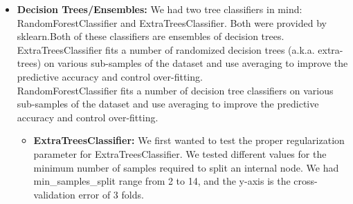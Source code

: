 \begin{itemize}
\begin{itemize}
    \pagebreak

    \item \textbf{Decision Trees/Ensembles:}
        We had two tree classifiers in mind: RandomForestClassifier and
        ExtraTreesClassifier. Both were provided by sklearn.Both of these
        classifiers are ensembles of decision trees. \\

        ExtraTreesClassifier fits
        a number of randomized decision trees (a.k.a. extra-trees) on various
        sub-samples of the dataset and use averaging to improve the predictive
        accuracy and control over-fitting. \\

        RandomForestClassifier fits a number of decision tree classifiers on
        various sub-samples of the dataset and use averaging to improve the
        predictive accuracy and control over-fitting. \\
        \begin{itemize}
            \item \textbf{ExtraTreesClassifier:}
                We first wanted to test the proper regularization parameter
                for ExtraTreesClassifier. We tested different values for
                the minimum number of samples required to split an internal
                node. We had min_samples_split range from 2 to 14, and the
                y-axis is the cross-validation error of 3 folds. \\


\end{itemize}
\end{itemize}
\end{itemize}
